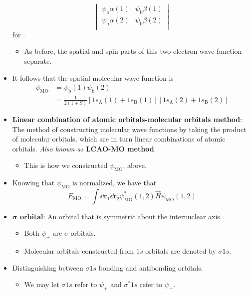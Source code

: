 \documentclass[../notes.tex]{subfiles}
\begin{document}
\begin{itemize}
\begin{equation*}
\begin{vmatrix}
            \psi_\text{b}\alpha(1) & \psi_\text{b}\beta(1)\\
            \psi_\text{b}\alpha(2) & \psi_\text{b}\beta(2)\\
        \end{vmatrix}
    \end{equation*}
    for .
    \begin{itemize}
        \item As before, the spatial and spin parts of this two-electron wave function separate.
    \end{itemize}
    \item It follows that the spatial molecular wave function is
    \begin{align*}
        \psi_\text{MO} &= \psi_\text{b}(1)\psi_\text{b}(2)\\
        &= \frac{1}{2(1+S)}[1s_\text{A}(1)+1s_\text{B}(1)][1s_\text{A}(2)+1s_\text{B}(2)]
    \end{align*}
    \item \textbf{Linear combination of atomic orbitals-molecular orbitals method}: The method of constructing molecular wave functions by taking the product of molecular orbitals, which are in turn linear combinations of atomic orbitals. \emph{Also known as} \textbf{LCAO-MO method}.
    \begin{itemize}
        \item This is how we constructed $\psi_\text{MO}$, above.
    \end{itemize}
    \item Knowing that $\psi_\text{MO}$ is normalized, we have that
    \begin{equation*}
        E_\text{MO} = \int\dd{\mathbf{r}_1}\dd{\mathbf{r}_2}\psi_\text{MO}^*(1,2)\hat{H}\psi_\text{MO}(1,2)
    \end{equation*}
    \item \textbf{$\bm{\sigma}$ orbital}: An orbital that is symmetric about the internuclear axis.
    \begin{itemize}
        \item Both $\psi_\pm$ are $\sigma$ orbitals.
        \item Molecular orbitals constructed from $1s$ orbitals are denoted by $\sigma 1s$.
    \end{itemize}
    \item Distinguishing between $\sigma 1s$ bonding and antibonding orbitals.
    \begin{itemize}
        \item We may let $\sigma 1s$ refer to $\psi_+$ and $\sigma^*1s$ refer to $\psi_-$.

\end{itemize}
\end{itemize}
\end{document}
